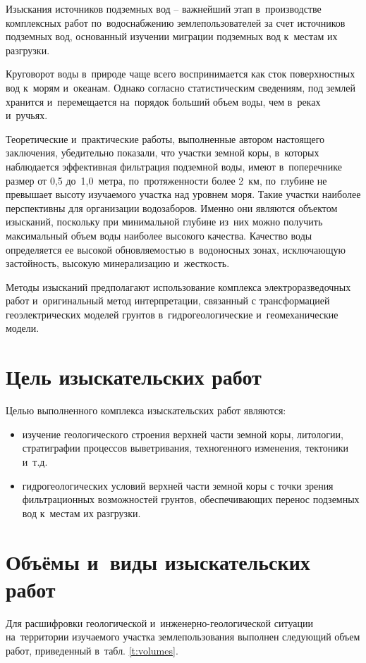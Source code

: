 Изыскания источников подземных вод -- важнейший этап в~производстве комплексных работ по~водоснабжению землепользователей за счет источников подземных вод, основанный изучении миграции подземных вод к~местам их разгрузки.

Круговорот воды в~природе чаще всего воспринимается как сток поверхностных вод к~морям и~океанам. Однако согласно статистическим сведениям, под землей хранится и~перемещается на~порядок больший объем воды, чем в~реках и~ручьях.

Теоретические и~практические работы, выполненные автором настоящего заключения, убедительно показали, что участки земной коры, в~которых наблюдается эффективная фильтрация подземной воды, имеют в~поперечнике размер от 0,5 до~1,0~метра, по~протяженности более 2~км, по~глубине не превышает высоту изучаемого участка над уровнем моря. Такие участки наиболее перспективны для организации водозаборов. Именно они являются объектом изысканий, поскольку при минимальной глубине из~них можно получить максимальный объем воды наиболее высокого качества. Качество воды определяется ее высокой обновляемостью в~водоносных зонах, исключающую застойность, высокую минерализацию и~жесткость.

Методы изысканий предполагают использование комплекса электроразведочных работ и~оригинальный метод интерпретации, связанный с трансформацией геоэлектрических моделей грунтов в~гидрогеологические и~геомеханические модели.

\section{Цель изыскательских работ}
Целью выполненного комплекса изыскательских работ являются:
\begin{itemize}
	\item изучение геологического строения верхней части земной коры, литологии, стратиграфии процессов выветривания, техногенного изменения, тектоники и~т.д.
	\item гидрогеологических условий верхней части земной коры с точки зрения фильтрационных возможностей грунтов, обеспечивающих перенос подземных вод к~местам их разгрузки.
\end{itemize}


\section{Объёмы и~виды изыскательских работ}
Для расшифровки геологической и~инженерно-геологической ситуации на~территории изучаемого участка землепользования выполнен следующий объем работ, приведенный в~табл. {\ref{t:volumes}}.

